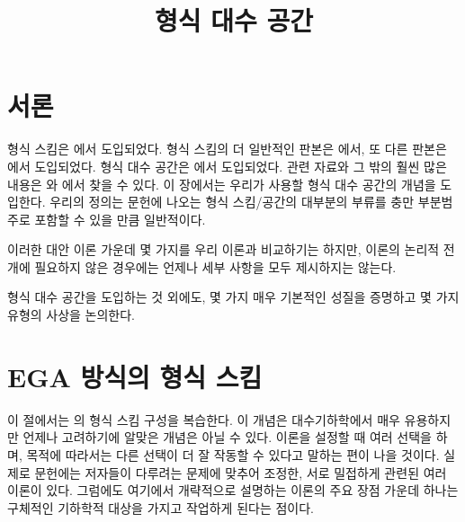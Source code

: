 

%


\title{형식 대수 공간}


\maketitle

\label{section-phantom}

\tableofcontents

\section{서론}
\label{section-introduction}

\noindent
형식 스킴은 \cite{EGA}에서 도입되었다. 형식 스킴의 더 일반적인
판본은 \cite{McQuillan}에서, 또 다른 판본은 \cite{Yasuda}에서
도입되었다. 형식 대수 공간은 \cite{Kn}에서 도입되었다.
관련 자료와 그 밖의 훨씬 많은 내용은
\cite{Abbes}와 \cite{Fujiwara-Kato}에서 찾을 수 있다.
이 장에서는 우리가 사용할 형식 대수 공간의 개념을 도입한다.
우리의 정의는 문헌에 나오는 형식 스킴/공간의 대부분의 부류를
충만 부분범주로 포함할 수 있을 만큼 일반적이다.

\medskip\noindent
이러한 대안 이론 가운데 몇 가지를 우리 이론과 비교하기는 하지만,
이론의 논리적 전개에 필요하지 않은 경우에는 언제나 세부 사항을
모두 제시하지는 않는다.

\medskip\noindent
형식 대수 공간을 도입하는 것 외에도, 몇 가지 매우 기본적인 성질을
증명하고 몇 가지 유형의 사상을 논의한다.








\section{EGA 방식의 형식 스킴}
\label{section-formal-schemes-EGA}

\noindent
이 절에서는 \cite{EGA}의 형식 스킴 구성을 복습한다.
이 개념은 대수기하학에서 매우 유용하지만 언제나 고려하기에 알맞은
개념은 아닐 수 있다. 이론을 설정할 때 여러 선택을 하며, 목적에 따라서는
다른 선택이 더 잘 작동할 수 있다고 말하는 편이 나을 것이다.
실제로 문헌에는 저자들이 다루려는 문제에 맞추어 조정한,
서로 밀접하게 관련된 여러 이론이 있다. 그럼에도 여기에서 개략적으로
설명하는 이론의 주요 장점 가운데 하나는 구체적인 기하학적 대상을
가지고 작업하게 된다는 점이다.

